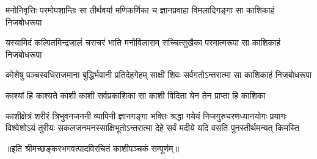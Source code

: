 

\fourlineindentedshloka
{मनोनिवृत्तिः परमोपशान्तिः}
{सा तीर्थवर्या मणिकर्णिका च}
{ज्ञानप्रवाहा विमलादिगङ्गा}
{सा काशिकाहं निजबोधरूपा} %

\fourlineindentedshloka
{यस्यामिदं कल्पितमिन्द्रजालं}
{चराचरं भाति मनोविलासम्}
{सच्चित्सुखैका परमात्मरूपा}
{सा काशिकाहं निजबोधरूपा} %

\fourlineindentedshloka
{कोशेषु पञ्चस्वधिराजमाना}
{बुद्धिर्भवानी प्रतिदेहगेहम्}
{साक्षी शिवः सर्वगतोऽन्तरात्मा}
{सा काशिकाहं निजबोधरूपा} %

\twolineshloka
{काश्यां हि काश्यते काशी काशी सर्वप्रकाशिका}
{सा काशी विदिता येन तेन प्राप्ता हि काशिका} %

\fourlineindentedshloka
{काशीक्षेत्रं शरीरं त्रिभुवनजननी व्यापिनी ज्ञानगङ्गा}
{भक्तिः श्रद्धा गयेयं निजगुरुचरणध्यानयोगः प्रयागः}
{विश्वेशोऽयं तुरीयः सकलजनमनस्साक्षिभूतोऽन्तरात्मा}
{देहे सर्वं मदीये यदि वसति पुनस्तीर्थमन्यत् किमस्ति} %

{॥इति श्रीमच्छङ्करभगवत्पादविरचितं काशीपञ्चकं सम्पूर्णम्॥}
